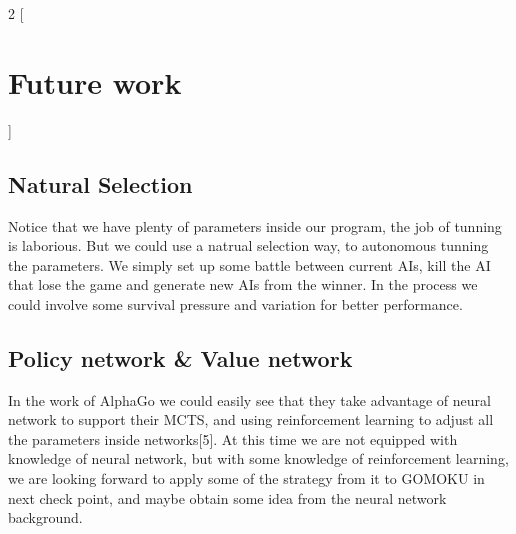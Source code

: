 \documentclass[a4paper, 11pt]{article} %
\begin{document}
	\begin{multicols}{2}
		[
		\section{Future work}
		]
		
		\subsection{Natural Selection}
		
		Notice that we have plenty of parameters inside our program, the job of tunning is laborious. But we could use a natrual selection way, to autonomous tunning the parameters. We simply set up some battle between current AIs, kill the AI that lose the game and generate new AIs from the winner. In the process we could involve some survival pressure and variation for better performance.
		
		\subsection{Policy network \& Value network}
		
		In the work of AlphaGo we could easily see that they take advantage of neural network to support their MCTS, and using reinforcement learning to adjust all the parameters inside networks[5]. At this time we are not equipped with knowledge of neural network, but with some knowledge of reinforcement learning, we are looking forward to apply some of the strategy from it to GOMOKU in next check point, and maybe obtain some idea from the neural network background.
		
	\end{multicols}
\end{document}
